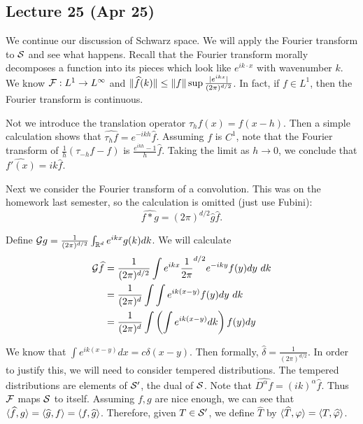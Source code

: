 \documentclass[10pt, twoside]{article}
\begin{document}
    \subsection{Lecture 25 (Apr 25)} We continue our discussion of Schwarz
    space. We will apply the Fourier transform to $\mathcal{S}$ and see what
    happens. Recall that the Fourier transform morally decomposes a function
    into its pieces which look like $e^{ik\cdot x}$ with wavenumber $k$. We
    know $\mathcal{F}:L^1 \to L^{\infty}$ and $\lVert\widehat{f}(k)\rVert\leq \lVert f\rVert
    \sup \frac{\lvert e^{ikx}\rvert}{(2\pi)^{d/2}}$. In fact, if $f \in L^1$, then the
    Fourier transform is continuous.

    Not we introduce the translation operator $\tau_h f(x) = f(x-h)$. Then a
    simple calculation shows that $\widehat{\tau_h f} = e^{-ikh} \widehat{f}$.
    Assuming $f$ is $C^1$, note that the Fourier transform of $\frac{1}{h}
    (\tau_{-h}f - f)$ is $\frac{e^{ikh}-1}{h} \widehat{f}$. Taking the limit as
    $h \to 0$, we conclude that $\widehat{f'(x)} = ik \widehat{f}$.

    Next we consider the Fourier transform of a convolution. This was on the
    homework last semester, so the calculation is omitted (just use Fubini):
    \[\widehat{f*g} = (2\pi)^{d/2} \widehat{g} \widehat{f}.\] 

    Define $\mathcal{G}g = \frac{1}{(2\pi)^{d/2}} \int_{\mathbb{R}^d} e^{ikx} g(k) dk$. We
    will calculate \begin{align*} \mathcal{G}\widehat{f} &= \frac{1}{(2\pi)^{d/2}}
        \int e^{ikx} \frac{1}{2\pi}^{d/2}e^{-iky} f(y) dy\ dk\\ &=
        \frac{1}{(2\pi)^d} \int \int e^{ik(x-y)}f(y) dy\ dk \\ &=
    \frac{1}{(2\pi)^d} \int \left( \int e^{ik(x-y)} dk \right) f(y) dy
    \end{align*}

    We know that $\int e^{ik(x-y)} dx = c \delta(x-y)$. Then formally,
    $\widehat{\delta} = \frac{1}{(2\pi)^{d/2}}$. In order to justify this, we
    will need to consider tempered distributions. The tempered distributions
    are elements of $\mathcal{S'}$, the dual of $\mathcal{S}$. Note that
    $\widehat{D^{\alpha}f} = (ik)^{\alpha} \widehat{f}$. Thus $\mathcal{F}$ maps
    $\mathcal{S}$ to itself. Assuming $f,g$ are nice enough, we can see that
    $\langle\widehat{f},g\rangle = \langle\widehat{g},f\rangle = \langle f,\widehat{g}\rangle$.
    Therefore, given $T \in \mathcal{S'}$, we define $\widehat{T}$ by
    $\langle\widehat{T}, \varphi\rangle = \langle T,\widehat{\varphi}\rangle$.
\end{document}
